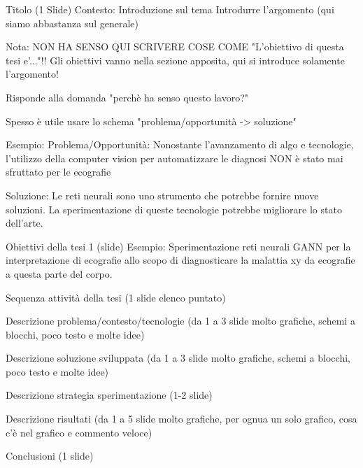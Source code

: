 Titolo (1 Slide)
Contesto: Introduzione sul tema
Introdurre l'argomento (qui siamo abbastanza sul generale)

Nota: NON HA SENSO QUI SCRIVERE COSE COME "L'obiettivo di questa tesi
e'..."!!
Gli obiettivi vanno nella sezione apposita, qui si introduce solamente
l'argomento!

Risponde alla domanda "perchè ha senso questo lavoro?"

Spesso è utile usare lo schema "problema/opportunità -> soluzione"

Esempio:
Problema/Opportunità: Nonostante l'avanzamento di algo e tecnologie, l'utilizzo della computer vision per automatizzare le diagnosi NON è stato mai sfruttato per le ecografie

Soluzione: Le reti neurali sono uno strumento che potrebbe fornire nuove soluzioni. La sperimentazione di queste tecnologie potrebbe migliorare lo stato dell'arte.

Obiettivi della tesi 1 (slide)
Esempio: Sperimentazione reti neurali GANN per la interpretazione di ecografie allo scopo di diagnosticare la malattia xy da ecografie a questa parte del corpo.

Sequenza attività della tesi (1 slide elenco puntato)

Descrizione problema/contesto/tecnologie  (da 1 a 3 slide molto grafiche, schemi a blocchi, poco testo e molte idee)

Descrizione soluzione sviluppata (da 1 a 3 slide molto grafiche, schemi a blocchi, poco testo e molte idee)

Descrizione strategia sperimentazione (1-2 slide)

Descrizione risultati  (da 1 a 5 slide molto grafiche, per ognua un solo grafico, cosa c'è nel grafico e commento veloce)

Conclusioni (1 slide)
